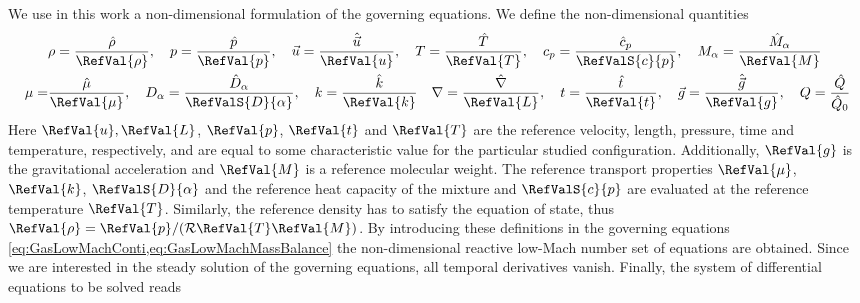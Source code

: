 We use in this work a non-dimensional formulation of the governing equations. We define the non-dimensional quantities
\begin{align*}
&\rho = \frac{\hat \rho}{\RefVal{\rho}}, \quad 
p = \frac{\hat p}{\RefVal{p}}, \quad 
\vec{u}= \frac{\hat{\vec{u}}}{\RefVal{u}}, \quad 
T = \frac{\hat T}{\RefVal{T}},  \quad 
c_p = \frac{\hat c_p}{\RefValS{c}{p}}, \quad
M_\alpha = \frac{\hat{M}_\alpha}{\RefVal{M}}
\\
\mu = &\frac{\hat \mu}{\RefVal{\mu}},\quad
D_\alpha = \frac{\hat D_\alpha}{\RefValS{D}{\alpha}}, \quad
k = \frac{\hat k}{\RefVal{k}}\quad
\nabla = \frac{\hat \nabla}{\RefVal{L}}, \quad
t = \frac{\hat{t}}{\RefVal{t}},\quad 
\vec{g} = \frac{\hat{\vec{g}}}{\RefVal{g}},\quad
Q = \frac{\hat Q}{\hat{Q}_0}
\end{align*}
Here $\RefVal{u}, \RefVal{L}$, $\RefVal{p}$, $\RefVal{t}$ and $\RefVal{T}$ are the reference velocity, length, pressure, time and temperature, respectively, and are equal to some characteristic value for the particular studied configuration. Additionally, $\RefVal{g}$ is the gravitational acceleration and $\RefVal{M}$ is a reference molecular weight.  The reference transport properties $\RefVal{\mu}$, $\RefVal{k}$, $\RefValS{D}{\alpha}$ and the reference heat capacity of the mixture and $\RefValS{c}{p}$ are evaluated at the reference temperature $\RefVal{T}$. Similarly, the reference density has to satisfy the equation of state, thus $\RefVal{\rho} = \RefVal{p}/(\mathcal{R}\RefVal{T}\RefVal{M})$.  By introducing these definitions in the governing equations \cref{eq:GasLowMachConti,eq:GasLowMachMassBalance} the non-dimensional reactive low-Mach number set of equations are obtained. Since we are interested in the steady solution of the governing equations, all temporal derivatives vanish. Finally, the system of differential equations to be solved reads 
